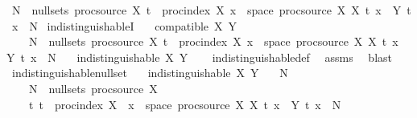 \begin{isabellebody}
{\ {\isacharparenleft}{\kern0pt}{\isasymexists}N\ {\isasymin}\ null{\isacharunderscore}{\kern0pt}sets\ {\isacharparenleft}{\kern0pt}proc{\isacharunderscore}{\kern0pt}source\ X{\isacharparenright}{\kern0pt}{\isachardot}{\kern0pt}\ {\isasymforall}t\ {\isasymin}\ proc{\isacharunderscore}{\kern0pt}index\ X{\isachardot}{\kern0pt}\ {\isacharbraceleft}{\kern0pt}x\ {\isasymin}\ space\ {\isacharparenleft}{\kern0pt}proc{\isacharunderscore}{\kern0pt}source\ X{\isacharparenright}{\kern0pt}{\isachardot}{\kern0pt}\ X\ t\ x\ {\isasymnoteq}\ Y\ t\ x{\isacharbraceright}{\kern0pt}\ {\isasymsubseteq}\ N{\isacharparenright}{\kern0pt}{\isachardoublequoteclose}%
}%
\isamarkupfalse%
\ indistinguishableI{\isacharcolon}{\kern0pt}\isanewline
\ \ \ {\isachardoublequoteopen}compatible\ X\ Y{\isachardoublequoteclose}\ \isanewline
\ \ \ \ {\isachardoublequoteopen}{\isasymexists}N\ {\isasymin}\ null{\isacharunderscore}{\kern0pt}sets\ {\isacharparenleft}{\kern0pt}proc{\isacharunderscore}{\kern0pt}source\ X{\isacharparenright}{\kern0pt}{\isachardot}{\kern0pt}\ {\isacharparenleft}{\kern0pt}{\isasymforall}t\ {\isasymin}\ proc{\isacharunderscore}{\kern0pt}index\ X{\isachardot}{\kern0pt}\ {\isacharbraceleft}{\kern0pt}x\ {\isasymin}\ space\ {\isacharparenleft}{\kern0pt}proc{\isacharunderscore}{\kern0pt}source\ X{\isacharparenright}{\kern0pt}{\isachardot}{\kern0pt}\ X\ t\ x\ {\isasymnoteq}\ Y\ t\ x{\isacharbraceright}{\kern0pt}\ {\isasymsubseteq}\ N{\isacharparenright}{\kern0pt}{\isachardoublequoteclose}\isanewline
\ \ \ {\isachardoublequoteopen}indistinguishable\ X\ Y{\isachardoublequoteclose}\isanewline
%
\isadelimproof
\ \ %
\endisadelimproof
%
\isatagproof
{}\isamarkupfalse%
\ indistinguishable{\isacharunderscore}{\kern0pt}def\ \isamarkupfalse%
\ assms\ \isamarkupfalse%
\ blast%
\endisatagproof
{\isafoldproof}%
%
\isadelimproof
\isanewline
%
\endisadelimproof
\isanewline
{}\isamarkupfalse%
\ indistinguishable{\isacharunderscore}{\kern0pt}null{\isacharunderscore}{\kern0pt}set{\isacharcolon}{\kern0pt}\isanewline
\ \ \ {\isachardoublequoteopen}indistinguishable\ X\ Y{\isachardoublequoteclose}\isanewline
\ \ \ N\ \ \isanewline
\ \ \ \ {\isachardoublequoteopen}N\ {\isasymin}\ null{\isacharunderscore}{\kern0pt}sets\ {\isacharparenleft}{\kern0pt}proc{\isacharunderscore}{\kern0pt}source\ X{\isacharparenright}{\kern0pt}{\isachardoublequoteclose}\isanewline
\ \ \ \ {\isachardoublequoteopen}{\isasymAnd}t{\isachardot}{\kern0pt}\ t\ {\isasymin}\ proc{\isacharunderscore}{\kern0pt}index\ X\ {\isasymLongrightarrow}\ {\isacharbraceleft}{\kern0pt}x\ {\isasymin}\ space\ {\isacharparenleft}{\kern0pt}proc{\isacharunderscore}{\kern0pt}source\ X{\isacharparenright}{\kern0pt}{\isachardot}{\kern0pt}\ X\ t\ x\ {\isasymnoteq}\ Y\ t\ x{\isacharbraceright}{\kern0pt}\ {\isasymsubseteq}\ N{\isachardoublequoteclose}\isanewline

\end{isabellebody}
